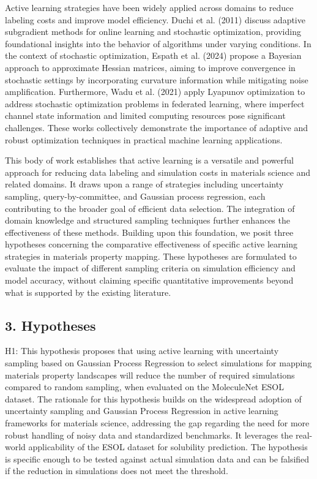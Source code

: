 Active learning strategies have been widely applied across domains to reduce labeling costs and improve model efficiency. Duchi et al. (2011) discuss adaptive subgradient methods for online learning and stochastic optimization, providing foundational insights into the behavior of algorithms under varying conditions. In the context of stochastic optimization, Espath et al. (2024) propose a Bayesian approach to approximate Hessian matrices, aiming to improve convergence in stochastic settings by incorporating curvature information while mitigating noise amplification. Furthermore, Wadu et al. (2021) apply Lyapunov optimization to address stochastic optimization problems in federated learning, where imperfect channel state information and limited computing resources pose significant challenges. These works collectively demonstrate the importance of adaptive and robust optimization techniques in practical machine learning applications.

This body of work establishes that active learning is a versatile and powerful approach for reducing data labeling and simulation costs in materials science and related domains. It draws upon a range of strategies including uncertainty sampling, query-by-committee, and Gaussian process regression, each contributing to the broader goal of efficient data selection. The integration of domain knowledge and structured sampling techniques further enhances the effectiveness of these methods. Building upon this foundation, we posit three hypotheses concerning the comparative effectiveness of specific active learning strategies in materials property mapping. These hypotheses are formulated to evaluate the impact of different sampling criteria on simulation efficiency and model accuracy, without claiming specific quantitative improvements beyond what is supported by the existing literature.

\subsection*{3. Hypotheses}

H1: This hypothesis proposes that using active learning with uncertainty sampling based on Gaussian Process Regression to select simulations for mapping materials property landscapes will reduce the number of required simulations compared to random sampling, when evaluated on the MoleculeNet ESOL dataset. The rationale for this hypothesis builds on the widespread adoption of uncertainty sampling and Gaussian Process Regression in active learning frameworks for materials science, addressing the gap regarding the need for more robust handling of noisy data and standardized benchmarks. It leverages the real-world applicability of the ESOL dataset for solubility prediction. The hypothesis is specific enough to be tested against actual simulation data and can be falsified if the reduction in simulations does not meet the threshold.

